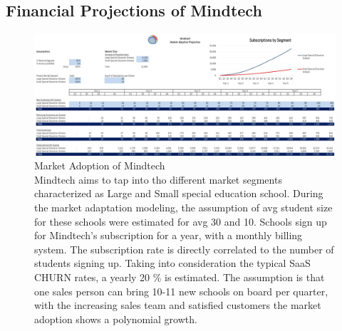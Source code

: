 \documentclass[letterpaper,10pt]{article}
\let\oldsection\section
\renewcommand{\section}{\def\cursectioning{section}\oldsection}
\begin{document}
\begin{appendices}

\section{Financial Projections of Mindtech}
\label{appendix:fin}


\begin{landscape}
\begin{figure}[!htb]
\centering
\includegraphics[scale=0.5]{market-1.jpg}
\caption[Market Adoption of Mindtech]{Market Adoption of Mindtech \\ Mindtech aims to tap into tho different market segments characterized as Large and Small special education school. During the market adaptation modeling, the assumption of avg student size for these schools were estimated for avg 30 and 10. Schools sign up for Mindtech's subscription for a year, with a monthly billing system. The subscription rate is directly correlated to the number of students signing up. Taking into consideration the typical SaaS CHURN rates, a yearly 20 \% is estimated. The assumption is that one sales person can bring 10-11 new schools on board per quarter, with the increasing sales team and satisfied customers the market adoption shows a polynomial growth.}
\end{figure}
\end{landscape}



\end{appendices}
\end{document}
